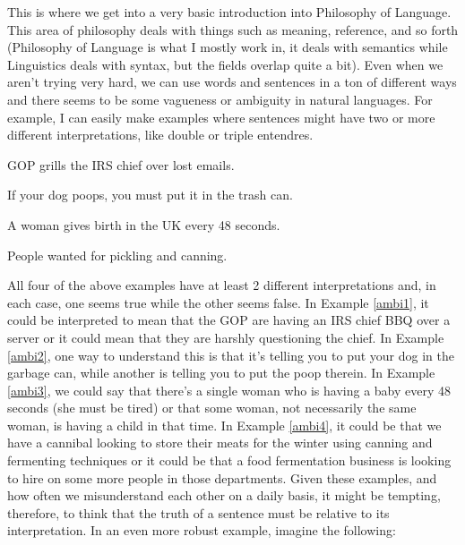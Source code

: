 This is where we get into a very basic introduction into Philosophy of Language. This area of philosophy deals with things such as meaning, reference, and so forth (Philosophy of Language is what I mostly work in, it deals with semantics while Linguistics deals with syntax, but the fields overlap quite a bit). Even when we aren't trying very hard, we can use words and sentences in a ton of different ways and there seems to be some vagueness or ambiguity in natural languages. For example, I can easily make examples where sentences might have two or more different interpretations, like double or triple entendres. \\
\begin{earg}
\item[\ex{ambi1}] GOP grills the IRS chief over lost emails.
\item[\ex{ambi2}] If your dog poops, you must put it in the trash can.
\item[\ex{ambi3}] A woman gives birth in the UK every 48 seconds.
\item[\ex{ambi4}] People wanted for pickling and canning.
\end{earg}
All four of the above examples have at least 2 different interpretations and, in each case, one seems true while the other seems false. In Example \ref{ambi1}, it could be interpreted to mean that the GOP are having an IRS chief BBQ over a server or it could mean that they are harshly questioning the chief. In Example \ref{ambi2}, one way to understand this is that it's telling you to put your dog in the garbage can, while another is telling you to put the poop therein. In Example \ref{ambi3}, we could say that there's a single woman who is having a baby every 48 seconds (she must be tired) or that some woman, not necessarily the same woman, is having a child in that time. In Example \ref{ambi4}, it could be that we have a cannibal looking to store their meats for the winter using canning and fermenting techniques or it could be that a food fermentation business is looking to hire on some more people in those departments. Given these examples, and how often we misunderstand each other on a daily basis,  it might be tempting, therefore, to think that the truth of a sentence must be relative to its interpretation.  In an even more robust example, imagine the following:
